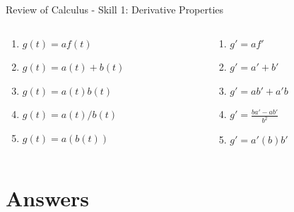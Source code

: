 \documentclass{beamer}
\begin{document}
\begin{frame}{Review of Calculus - Skill 1: Derivative Properties}
\begin{columns}[T]
\begin{column}{0.5\textwidth}
\begin{enumerate}
\item $g(t) = af(t)$
\item $g(t) = a(t) + b(t)$
\item $g(t) = a(t)b(t)$
\item $g(t) = a(t)/b(t)$
\item $g(t) = a(b(t))$
\end{enumerate}
\end{column}
\begin{column}{0.5\textwidth}
\begin{enumerate}
\item $g' = af'$
\item $g' = a'+b'$
\item $g' = ab'+a'b$
\item $g' = \frac{ba'-ab'}{b^2}$
\item $g' = a'(b)b'$
\end{enumerate}
\end{column}
\end{columns}
\end{frame}

\section{Answers}
\end{document}
